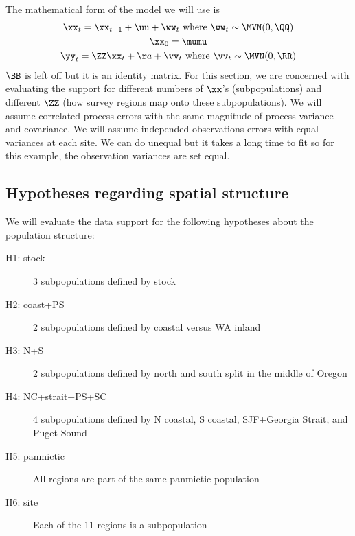 The mathematical form of the model we will use is 
\begin{equation}\label{eqn:spat.struc.marss}
\begin{gathered}
\xx_t = \xx_{t-1}+\uu+\ww_t \text{ where } \ww_t \sim \MVN(0,\QQ) \\
\xx_0 = \mumu \\
\yy_t = \ZZ\xx_t+\aa+\vv_t \text{ where } \vv_t \sim \MVN(0,\RR)
 \end{gathered}   
\end{equation}
$\BB$ is left off but it is an identity matrix.  For this section, we are concerned with evaluating the support for different numbers of $\xx$'s (subpopulations) and different $\ZZ$ (how survey regions map onto these subpopulations).  We will assume correlated process errors with the same magnitude of process variance and covariance.  We will assume independed observations errors with equal variances at each site. We can do unequal but it takes a long time to fit so for this example, the observation variances are set equal.

\subsection{Hypotheses regarding spatial structure}

We will evaluate the data support for the following hypotheses about the population structure: 
\begin{description}
\item [H1: stock] 3 subpopulations defined by stock
\item [H2: coast+PS] 2 subpopulations defined by coastal versus WA inland
\item [H3: N+S] 2 subpopulations defined by north and south split in the middle of Oregon
\item [H4: NC+strait+PS+SC] 4 subpopulations defined by N coastal, S coastal, SJF+Georgia Strait, and Puget Sound
\item [H5: panmictic] All regions are part of the same panmictic population
\item [H6: site] Each of the 11 regions is a subpopulation
\end{description}

